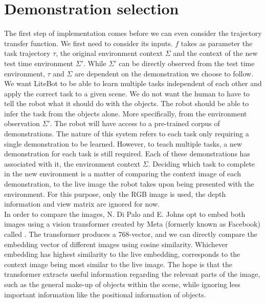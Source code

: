 \section{Demonstration selection}
\label{sec:demo-selection}
The first step of implementation comes before we can even consider the trajectory transfer function. We first need to consider its inputs. $f$ takes as parameter the task trajectory $\tau$, the original environment context $\Sigma$ and the context of the new test time environment $\Sigma'$. While $\Sigma'$ can be directly observed from the test time environment, $\tau$ and $\Sigma$ are dependent on the demonstration we choose to follow.\\

We want LiteBot to be able to learn multiple tasks independent of each other and apply the correct task to a given scene. We do not want the human to have to tell the robot what it should do with the objects. The robot should be able to infer the task from the objects alone. More specifically, from the environment observation $\Sigma'$. The robot will have access to a pre-trained corpus of demonstrations. The  nature of this system refers to each task only requiring a single demonstration to be learned. However, to teach multiple tasks, a new demonstration for each task is still required. Each of these demonstrations has associated with it, the environment context $\Sigma$. Deciding which task to complete in the new environment is a matter of comparing the context image of each demonstration, to the live image the robot takes upon being presented with the environment. For this purpose, only the RGB image is used, the depth information and view matrix are ignored for now.\\

In order to compare the images, N. Di Palo and E. Johns \cite{one-shot-imitation} opt to embed both images using a vision transformer created by Meta (formerly known as Facebook) called  \cite{dino-paper}. The transformer produces a 768-vector, and we can directly compare the embedding vector of different images using cosine similarity. Whichever embedding has highest similarity to the live embedding, corresponds to the context image being most similar to the live image. The hope is that the transformer extracts useful information regarding the relevant parts of the image, such as the general make-up of objects within the scene, while ignoring less important information like the positional information of objects.\\


